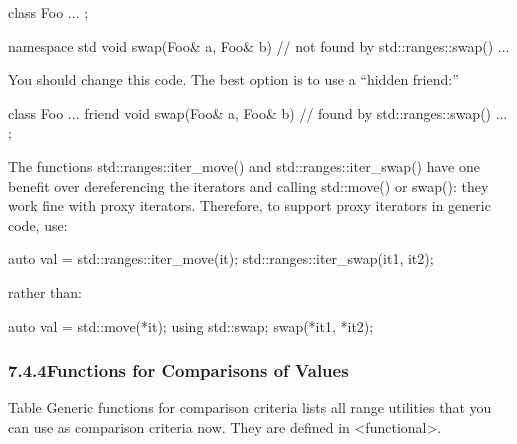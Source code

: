 \begin{cpp}
class Foo {
	...
};

namespace std {
	void swap(Foo& a, Foo& b) { // not found by std::ranges::swap()
		...
	}
}
\end{cpp}

You should change this code. The best option is to use a “hidden friend:”

\begin{cpp}
class Foo {
	...
	friend void swap(Foo& a, Foo& b) { // found by std::ranges::swap()
		...
	}
};
\end{cpp}

The functions std::ranges::iter\_move() and std::ranges::iter\_swap() have one benefit over dereferencing the iterators and calling std::move() or swap(): they work fine with proxy iterators. Therefore, to support proxy iterators in generic code, use:

\begin{cpp}
auto val = std::ranges::iter_move(it);
std::ranges::iter_swap(it1, it2);
\end{cpp}

rather than:

\begin{cpp}
auto val = std::move(*it);
using std::swap;
swap(*it1, *it2);
\end{cpp}

\subsubsection*{ 7.4.4\hspace{0.2cm}Functions for Comparisons of Values}

Table Generic functions for comparison criteria lists all range utilities that you can use as comparison criteria now. They are defined in <functional>.


